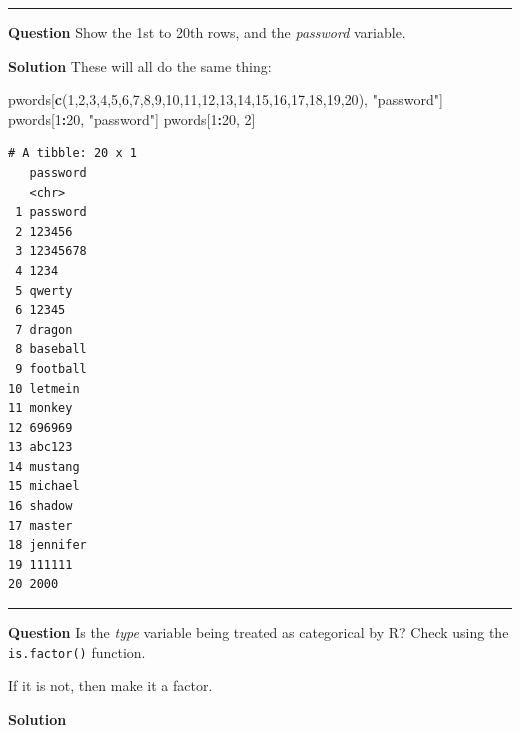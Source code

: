 \documentclass[]{book}
\newenvironment{Shaded}{\begin{snugshade}}{\end{snugshade}}
\newcommand{\DecValTok}[1]{\textcolor[rgb]{0.00,0.00,0.81}{#1}}
\newcommand{\KeywordTok}[1]{\textcolor[rgb]{0.13,0.29,0.53}{\textbf{#1}}}
\newcommand{\NormalTok}[1]{#1}
\newcommand{\OperatorTok}[1]{\textcolor[rgb]{0.81,0.36,0.00}{\textbf{#1}}}
\newcommand{\StringTok}[1]{\textcolor[rgb]{0.31,0.60,0.02}{#1}}
\begin{document}
\begin{center}\rule{0.5\linewidth}{0.5pt}\end{center}

\textbf{Question }
Show the 1st to 20th rows, and the \emph{password} variable.

\textbf{Solution }
These will all do the same thing:

\begin{Shaded}
\begin{Highlighting}[]
\NormalTok{pwords[}\KeywordTok{c}\NormalTok{(}\DecValTok{1}\NormalTok{,}\DecValTok{2}\NormalTok{,}\DecValTok{3}\NormalTok{,}\DecValTok{4}\NormalTok{,}\DecValTok{5}\NormalTok{,}\DecValTok{6}\NormalTok{,}\DecValTok{7}\NormalTok{,}\DecValTok{8}\NormalTok{,}\DecValTok{9}\NormalTok{,}\DecValTok{10}\NormalTok{,}\DecValTok{11}\NormalTok{,}\DecValTok{12}\NormalTok{,}\DecValTok{13}\NormalTok{,}\DecValTok{14}\NormalTok{,}\DecValTok{15}\NormalTok{,}\DecValTok{16}\NormalTok{,}\DecValTok{17}\NormalTok{,}\DecValTok{18}\NormalTok{,}\DecValTok{19}\NormalTok{,}\DecValTok{20}\NormalTok{), }\StringTok{"password"}\NormalTok{]}
\NormalTok{pwords[}\DecValTok{1}\OperatorTok{:}\DecValTok{20}\NormalTok{, }\StringTok{"password"}\NormalTok{]}
\NormalTok{pwords[}\DecValTok{1}\OperatorTok{:}\DecValTok{20}\NormalTok{, }\DecValTok{2}\NormalTok{]}
\end{Highlighting}
\end{Shaded}

\begin{verbatim}
# A tibble: 20 x 1
   password
   <chr>   
 1 password
 2 123456  
 3 12345678
 4 1234    
 5 qwerty  
 6 12345   
 7 dragon  
 8 baseball
 9 football
10 letmein 
11 monkey  
12 696969  
13 abc123  
14 mustang 
15 michael 
16 shadow  
17 master  
18 jennifer
19 111111  
20 2000    
\end{verbatim}

\begin{center}\rule{0.5\linewidth}{0.5pt}\end{center}

\textbf{Question }
Is the \emph{type} variable being treated as categorical by R? Check using the \texttt{is.factor()} function.

If it is not, then make it a factor.

\textbf{Solution }

\begin{Shaded}
\end{Shaded}
\end{document}
